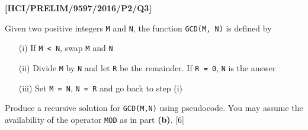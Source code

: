 \item \textbf{{[}HCI/PRELIM/9597/2016/P2/Q3{]} }

Given two positive integers \texttt{M} and \texttt{N}, the function
\texttt{GCD(M, N)} is defined by 
\begin{enumerate}
\item[(i)]  If \texttt{M < N}, swap \texttt{M} and \texttt{N} 
\item[(ii)]  Divide \texttt{M} by \texttt{N} and let \texttt{R} be the remainder.
If \texttt{R = 0}, \texttt{N} is the answer 
\item[(iii)]  Set \texttt{M = N}, \texttt{N = R} and go back to step (i)
\end{enumerate}
Produce a recursive solution for \texttt{GCD(M,N)} using pseudocode.
You may assume the availability of the operator \texttt{MOD} as in
part \textbf{(b)}.\hfill{} {[}6{]}